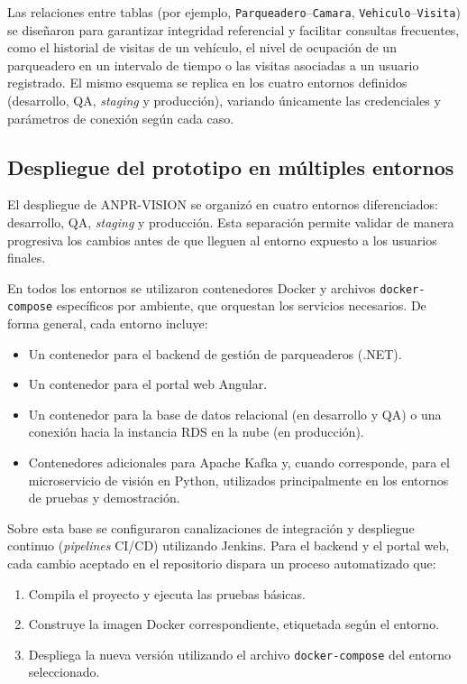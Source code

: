 Las relaciones entre tablas (por ejemplo, \texttt{Parqueadero}--\texttt{Camara}, \texttt{Vehiculo}--\texttt{Visita}) se diseñaron para garantizar integridad referencial y facilitar consultas frecuentes, como el historial de visitas de un vehículo, el nivel de ocupación de un parqueadero en un intervalo de tiempo o las visitas asociadas a un usuario registrado. El mismo esquema se replica en los cuatro entornos definidos (desarrollo, QA, \textit{staging} y producción), variando únicamente las credenciales y parámetros de conexión según cada caso.

\subsection{Despliegue del prototipo en múltiples entornos}

El despliegue de ANPR-VISION se organizó en cuatro entornos diferenciados: desarrollo, QA, \textit{staging} y producción. Esta separación permite validar de manera progresiva los cambios antes de que lleguen al entorno expuesto a los usuarios finales.

En todos los entornos se utilizaron contenedores Docker y archivos \texttt{docker-compose} específicos por ambiente, que orquestan los servicios necesarios. De forma general, cada entorno incluye:

\begin{itemize}
    \item Un contenedor para el backend de gestión de parqueaderos (.NET).
    \item Un contenedor para el portal web Angular.
    \item Un contenedor para la base de datos relacional (en desarrollo y QA) o una conexión hacia la instancia RDS en la nube (en producción).
    \item Contenedores adicionales para Apache Kafka y, cuando corresponde, para el microservicio de visión en Python, utilizados principalmente en los entornos de pruebas y demostración.
\end{itemize}

Sobre esta base se configuraron canalizaciones de integración y despliegue continuo (\textit{pipelines} CI/CD) utilizando Jenkins. Para el backend y el portal web, cada cambio aceptado en el repositorio dispara un proceso automatizado que:

\begin{enumerate}
    \item Compila el proyecto y ejecuta las pruebas básicas.
    \item Construye la imagen Docker correspondiente, etiquetada según el entorno.
    \item Despliega la nueva versión utilizando el archivo \texttt{docker-compose} del entorno seleccionado.
\end{enumerate}

